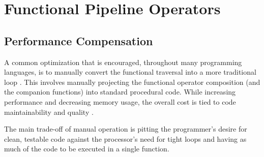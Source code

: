 \section{Functional Pipeline Operators}

\subsection{Performance Compensation}
A common optimization that is encouraged, throughout many programming languages, is to manually convert the functional traversal into a more traditional  loop \cite{iterperf09} \cite{iterperf10} \cite{iterperf11}.  This involves manually projecting the functional operator composition (and the companion functions) into standard procedural code.  While increasing performance and decreasing memory usage, the overall cost is tied to code maintainability and quality \cite{langstudy14}.  

The main trade-off of manual operation is pitting the programmer's desire for clean, testable code against the processor's need for tight loops and having as much of the code to be executed in a single function.  